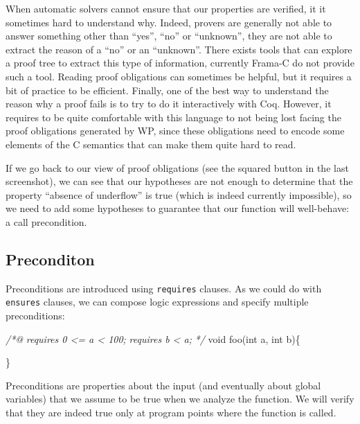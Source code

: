 \documentclass[12pt,francais,]{scrbook}
\newenvironment{Shaded}{}{}
\newcommand{\DataTypeTok}[1]{\textcolor[rgb]{0.56,0.13,0.00}{{#1}}}
\newcommand{\CommentTok}[1]{\textcolor[rgb]{0.38,0.63,0.69}{\textit{{#1}}}}
\newcommand{\NormalTok}[1]{{#1}}
\begin{document}
When automatic solvers cannot ensure that our properties are verified,
it it sometimes hard to understand why. Indeed, provers are generally
not able to answer something other than ``yes'', ``no'' or ``unknown'',
they are not able to extract the reason of a ``no'' or an ``unknown''.
There exists tools that can explore a proof tree to extract this type of
information, currently Frama-C do not provide such a tool. Reading proof
obligations can sometimes be helpful, but it requires a bit of practice
to be efficient. Finally, one of the best way to understand the reason
why a proof fails is to try to do it interactively with Coq. However, it
requires to be quite comfortable with this language to not being lost
facing the proof obligations generated by WP, since these obligations
need to encode some elements of the C semantics that can make them quite
hard to read.

If we go back to our view of proof obligations (see the squared button
in the last screenshot), we can see that our hypotheses are not enough
to determine that the property ``absence of underflow'' is true (which
is indeed currently impossible), so we need to add some hypotheses to
guarantee that our function will well-behave: a call precondition.

\subsection{Preconditon}\label{preconditon}

Preconditions are introduced using \texttt{requires} clauses. As we
could do with \texttt{ensures} clauses, we can compose logic expressions
and specify multiple preconditions:

\begin{footnotesize}\begin{Shaded}
\begin{Highlighting}[]
\CommentTok{/*@}
\CommentTok{  requires 0 <= a < 100;}
\CommentTok{  requires b < a;}
\CommentTok{*/}
\DataTypeTok{void} \NormalTok{foo(}\DataTypeTok{int} \NormalTok{a, }\DataTypeTok{int} \NormalTok{b)\{}
  
\NormalTok{\}}
\end{Highlighting}
\end{Shaded}\end{footnotesize}

Preconditions are properties about the input (and eventually about
global variables) that we assume to be true when we analyze the
function. We will verify that they are indeed true only at program
points where the function is called.
\end{document}
